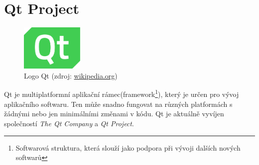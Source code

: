 \section{Qt Project}

\begin{figure}[H]
	 \centering
      \includegraphics[width=3cm]{./pictures/qt-logo.png}
      \caption{Logo Qt (zdroj:
\href{https://upload.wikimedia.org/wikipedia/commons/thumb/0/0b/Qt_logo_2016.svg/578px-Qt_logo_2016.svg.png}{wikipedia.org})}
      \label{fig:qt}
  \end{figure}
  
Qt je multiplatformní aplikační rámec(framework\footnote{Softwarová
  struktura, která slouží jako podpora při vývoji dalších nových
  softwarů}), který je určen pro vývoj aplikačního softwaru. Ten může
snadno fungovat na různých platformách s žádnými nebo jen minimálními
změnami v kódu. Qt je aktuálně vyvíjen společností \textit{The Qt
  Company} a \textit{Qt Project}.\cite{qt_wiki, qt}


